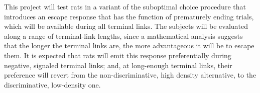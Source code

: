 \documentclass[a4paper,12pt]{article}
\begin{document}
This project will test rats in a variant of the suboptimal choice procedure that introduces an escape response that has the function of prematurely ending trials, which will be available during all terminal links. The subjects will be evaluated along a range of terminal-link lengths, since a mathematical analysis suggests that the longer the terminal links are, the more advantageous it will be to escape them. It is expected that rats will emit this response preferentially during negative, signaled terminal links; and, at long-enough terminal links, their preference will revert from the non-discriminative, high density alternative, to the discriminative, low-density one.


\printbibliography
\end{document}
